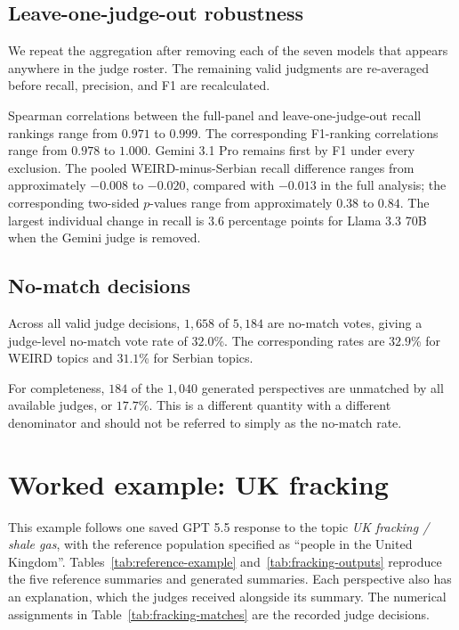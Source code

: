 \documentclass[11pt,a4paper]{article}
\begin{document}
\subsection{Leave-one-judge-out robustness}
\label{app:lojo}

We repeat the aggregation after removing each of the seven models that appears anywhere in the judge roster. The remaining valid judgments are re-averaged before recall, precision, and F1 are recalculated.

Spearman correlations between the full-panel and leave-one-judge-out recall rankings range from $0.971$ to $0.999$. The corresponding F1-ranking correlations range from $0.978$ to $1.000$. Gemini 3.1 Pro remains first by F1 under every exclusion. The pooled WEIRD-minus-Serbian recall difference ranges from approximately $-0.008$ to $-0.020$, compared with $-0.013$ in the full analysis; the corresponding two-sided $p$-values range from approximately $0.38$ to $0.84$. The largest individual change in recall is $3.6$ percentage points for Llama 3.3 70B when the Gemini judge is removed.

\subsection{No-match decisions}
\label{app:no_match}

Across all valid judge decisions, $1,658$ of $5,184$ are no-match votes, giving a judge-level no-match vote rate of $32.0$\%. The corresponding rates are $32.9$\% for WEIRD topics and $31.1$\% for Serbian topics.

For completeness, $184$ of the $1,040$ generated perspectives are unmatched by all available judges, or $17.7$\%. This is a different quantity with a different denominator and should not be referred to simply as the no-match rate.

\section{Worked example: UK fracking}
\label{app:worked-example}
This example follows one saved GPT 5.5 response to the topic \emph{UK fracking / shale gas}, with the reference population specified as ``people in the United Kingdom''. Tables~\ref{tab:reference-example} and~\ref{tab:fracking-outputs} reproduce the five reference summaries and generated summaries. Each perspective also has an explanation, which the judges received alongside its summary. The numerical assignments in Table~\ref{tab:fracking-matches} are the recorded judge decisions.
\end{document}
